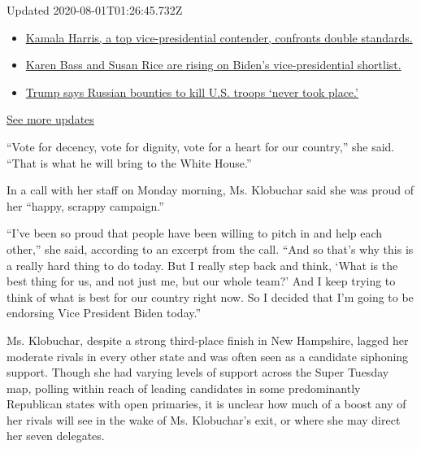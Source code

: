 Updated 2020-08-01T01:26:45.732Z

\begin{itemize}
\tightlist
\item
  \href{https://www.nytimes.com/2020/07/31/us/elections/biden-vs-trump.html?action=click\&pgtype=Article\&state=default\&region=MAIN_CONTENT_1\&context=storylines_live_updates\#link-29fdff45}{Kamala
  Harris, a top vice-presidential contender, confronts double
  standards.}
\item
  \href{https://www.nytimes.com/2020/07/31/us/elections/biden-vs-trump.html?action=click\&pgtype=Article\&state=default\&region=MAIN_CONTENT_1\&context=storylines_live_updates\#link-13ec3d9c}{Karen
  Bass and Susan Rice are rising on Biden's vice-presidential
  shortlist.}
\item
  \href{https://www.nytimes.com/2020/07/31/us/elections/biden-vs-trump.html?action=click\&pgtype=Article\&state=default\&region=MAIN_CONTENT_1\&context=storylines_live_updates\#link-49e9a016}{Trump
  says Russian bounties to kill U.S. troops `never took place.'}
\end{itemize}

\href{https://www.nytimes.com/2020/07/31/us/elections/biden-vs-trump.html?action=click\&pgtype=Article\&state=default\&region=MAIN_CONTENT_1\&context=storylines_live_updates}{See
more updates}

``Vote for decency, vote for dignity, vote for a heart for our
country,'' she said. ``That is what he will bring to the White House.''

In a call with her staff on Monday morning, Ms. Klobuchar said she was
proud of her ``happy, scrappy campaign.''

``I've been so proud that people have been willing to pitch in and help
each other,'' she said, according to an excerpt from the call. ``And so
that's why this is a really hard thing to do today. But I really step
back and think, `What is the best thing for us, and not just me, but our
whole team?' And I keep trying to think of what is best for our country
right now. So I decided that I'm going to be endorsing Vice President
Biden today.''

Ms. Klobuchar, despite a strong third-place finish in New Hampshire,
lagged her moderate rivals in every other state and was often seen as a
candidate siphoning support. Though she had varying levels of support
across the Super Tuesday map, polling within reach of leading candidates
in some predominantly Republican states with open primaries, it is
unclear how much of a boost any of her rivals will see in the wake of
Ms. Klobuchar's exit, or where she may direct her seven delegates.

